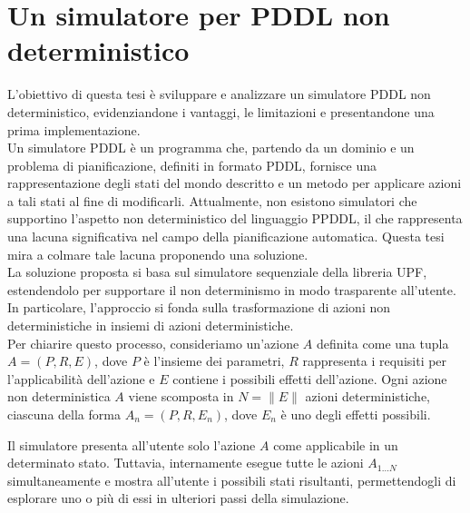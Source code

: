\documentclass[a4paper, 11pt, titlepage, twoside, openany]{book}
\begin{document}
\chapter{Un simulatore per PDDL non deterministico}
\label{sec:simulatore_non_deterministico}
L'obiettivo di questa tesi è sviluppare e analizzare un simulatore PDDL non deterministico, evidenziandone i vantaggi, le limitazioni e presentandone una prima implementazione. \\
Un simulatore PDDL è un programma che, partendo da un dominio e un problema di pianificazione, definiti in formato PDDL, fornisce una rappresentazione degli stati del mondo descritto e un metodo per applicare azioni a tali stati al fine di modificarli.
Attualmente, non esistono simulatori che supportino l'aspetto non deterministico del linguaggio PPDDL, il che rappresenta una lacuna significativa nel campo della pianificazione automatica. Questa tesi mira a colmare tale lacuna proponendo una soluzione. \\
La soluzione proposta si basa sul simulatore sequenziale della libreria UPF, estendendolo per supportare il non determinismo in modo trasparente all'utente. In particolare, l'approccio si fonda sulla trasformazione di azioni non deterministiche in insiemi di azioni deterministiche. \\
Per chiarire questo processo, consideriamo un'azione $A$ definita come una tupla $A=(P,R,E)$, dove $P$ è l'insieme dei parametri, $R$ rappresenta i requisiti per l'applicabilità dell'azione e $E$ contiene i possibili effetti dell'azione. Ogni azione non deterministica $A$ viene scomposta in $N=\|E\|$ azioni deterministiche, ciascuna della forma $A_n =(P,R,E_n)$, dove $E_n$ è uno degli effetti possibili. 

Il simulatore presenta all'utente solo l'azione $A$ come applicabile in un determinato stato. Tuttavia, internamente esegue tutte le azioni $A_{1\dots N}$ simultaneamente e mostra all'utente i possibili stati risultanti, permettendogli di esplorare uno o più di essi in ulteriori passi della simulazione.
\end{document}
